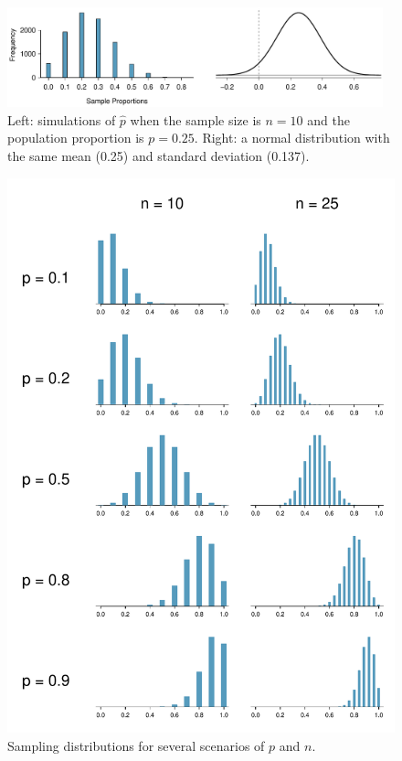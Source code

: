 \begin{figure}[t]
   \centering
   \includegraphics[width=0.97\textwidth]{ch_foundations_for_inf/figures/sampling_10_prop_25p/sampling_10_prop_25p}
   \caption{Left: simulations of $\hat{p}$ when the sample size
       is $n = 10$ and the population proportion is $p = 0.25$.
       Right: a normal distribution with the same mean (0.25)
       and standard deviation (0.137).}
   \label{sampling_10_prop_25p}
\end{figure}

\begin{figure}
   \centering
   \includegraphics[width=\textwidth]{ch_foundations_for_inf/figures/clt_prop_grid/clt_prop_grid_1}
   \caption{Sampling distributions for several scenarios
       of $p$ and $n$. \\ \ }
   \label{clt_prop_grid_1}
\end{figure}

